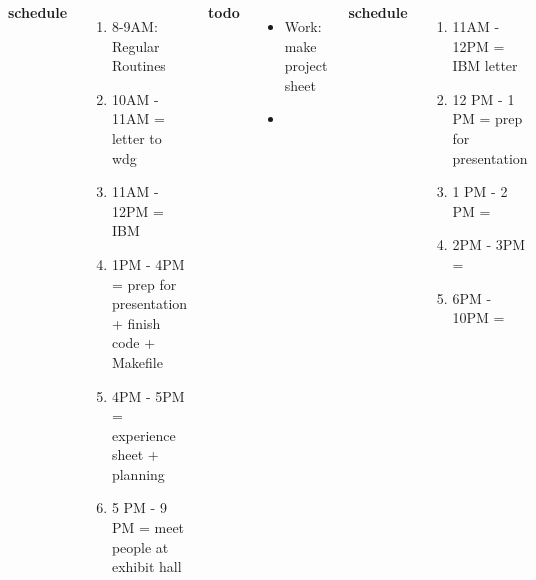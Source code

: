 \begin{frame}
{\begin{columns}
\begin{itemize}
          \end{itemize} 

          \textbf{\small schedule} \\
          \begin{enumerate} 
            \tiny \item \tiny 8-9AM: Regular Routines 

            \tiny \item \tiny 10AM - 11AM =  letter to wdg
          \item \tiny 11AM - 12PM = IBM 
              \tiny \item \tiny 1PM - 4PM = prep for presentation + finish code + Makefile 
              \tiny \item \tiny 4PM - 5PM = experience sheet +
              planning 
              \tiny \item \tiny 5 PM - 9 PM = meet people at exhibit hall 
          \end{enumerate} 
          
          \textbf{\small todo} \\
          \begin{itemize}
            \tiny \item \tiny Work: make project sheet  
          \item \tiny  {} 
          \end{itemize}  
          \textbf{\small schedule} 
          \begin{enumerate}
            \tiny \item \tiny 11AM - 12PM = IBM letter 

          \item \tiny 12 PM - 1 PM = prep for presentation 
          \item \tiny 1 PM - 2 PM = 
            \tiny \item \tiny 2PM - 3PM = 
          \item \tiny 6PM - 10PM = 
          \end{enumerate}  
          

\end{columns}}
\end{frame}
